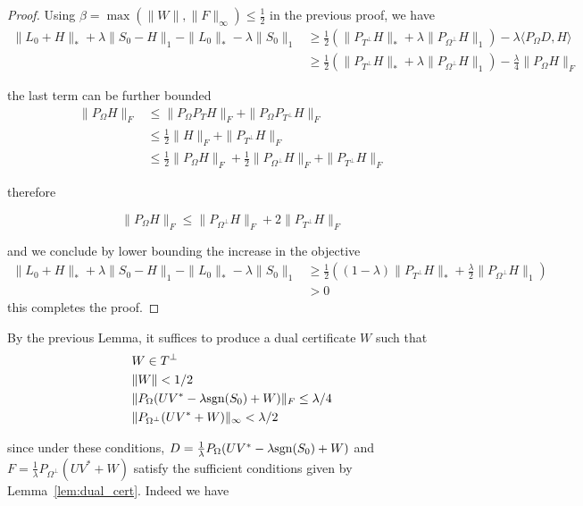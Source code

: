 \documentclass{../common/projectreport}
\begin{document}
\begin{proof}
Using $\beta = \max (\|W\|, \|F\|_\infty) \leq \frac{1}{2}$ in the previous proof, we have
\begin{align*}
\|L_0 + H\|_* + \lambda \|S_0 - H\|_1 - \|L_0\|_* - \lambda \|S_0 \|_1 
&\geq  \frac{1}{2} \left( \|P_{T^\perp} H\|_* + \lambda \|P_{\Omega^\perp} H\|_1 \right) - \lambda \langle P_{\Omega} D, H\rangle \\
& \geq \frac{1}{2} \left( \|P_{T^\perp} H\|_* + \lambda \|P_{\Omega^\perp} H\|_1 \right) - \frac{\lambda}{4} \|P_{\Omega} H\|_F
\end{align*}

the last term can be further bounded
\begin{align*}
\|P_\Omega H\|_F
&\leq \|P_\Omega P_T H\|_F + \|P_\Omega P_{T^\perp} H\|_F \\
&\leq \frac{1}{2} \|H\|_F + \|P_{T^\perp} H\|_F \\
&\leq \frac{1}{2} \|P_\Omega H\|_F + \frac{1}{2} \|P_{\Omega^\perp} H\|_F + \|P_{T^\perp} H\|_F
\end{align*}

therefore 

\[
\|P_\Omega H\|_F \leq \|P_{\Omega^\perp} H\|_F + 2 \|P_{T^\perp} H\|_F
\]

and we conclude by lower bounding the increase in the objective
\begin{align*}
\|L_0 + H\|_* + \lambda \|S_0 - H\|_1 - \|L_0\|_* - \lambda \|S_0 \|_1 
&\geq  \frac{1}{2} \left( (1- \lambda) \|P_{T^\perp} H\|_* + \frac{\lambda}{2} \|P_{\Omega^\perp} H\|_1 \right) \\
& > 0
\end{align*}
this completes the proof.

\end{proof}

By the previous Lemma, it suffices to produce a dual certificate $W$ such that
\begin{equation}
\begin{aligned}
& W \in T^{\perp} \\
& \|W\| < 1/2\\
& \|P_\Omega (UV^* - \lambda \text{sgn}(S_0) + W) \|_F \leq \lambda / 4  \\
& \|P_{\Omega^\perp}(UV^* + W)\|_\infty < \lambda / 2
\end{aligned}
\end{equation}

since under these conditions, $D = \frac{1}{\lambda} P_\Omega (UV^* - \lambda \text{sgn}(S_0) + W)$ and $F = \frac{1}{\lambda} P_{\Omega^\perp} (UV^* + W)$ satisfy the sufficient conditions given by Lemma~\ref{lem:dual_cert}. Indeed we have
\end{document}
